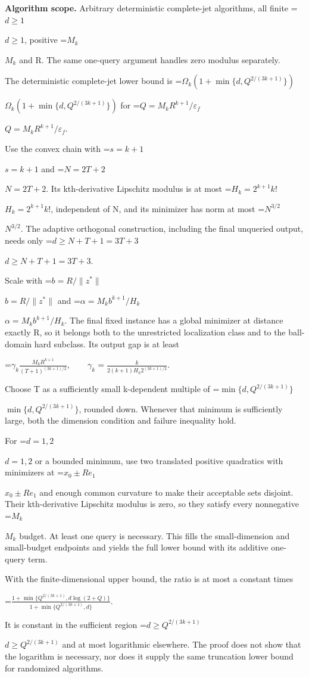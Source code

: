 \documentclass[10pt,a4paper]{article}
\newcommand{\AtlasMath}[1]{\par\begingroup\centering\setbox0=\hbox{$\displaystyle #1$}\ifdim\wd0>1.4\linewidth\typeout{ATLAS WIDE FORMULA: \the\wd0}\fi\ifdim\wd0>\linewidth\resizebox{\linewidth}{!}{\box0}\else\box0\fi\par\endgroup}
\newcommand{\AtlasInlineMath}[1]{\begingroup\setbox0=\hbox{$#1$}\ifdim\wd0>.4\linewidth\endgroup\AtlasMath{#1}\else\endgroup$#1$\fi}
\begin{document}
\textbf{Algorithm scope.} Arbitrary deterministic complete-jet algorithms, all finite \AtlasInlineMath{d\ge1}, positive \AtlasInlineMath{M_k} and R. The same one-query argument handles zero modulus separately.

The deterministic complete-jet lower bound is \AtlasInlineMath{\Omega_k(1+\min\{d,Q^{2/(3k+1)}\})} for \AtlasInlineMath{Q=M_kR^{k+1}/\varepsilon_f}.

Use the convex chain with \AtlasInlineMath{s=k+1} and \AtlasInlineMath{N=2T+2}. Its kth-derivative Lipschitz modulus is at most \AtlasInlineMath{H_k=2^{k+1}k!}, independent of N, and its minimizer has norm at most \AtlasInlineMath{N^{3/2}}. The adaptive orthogonal construction, including the final unqueried output, needs only \AtlasInlineMath{d\ge N+T+1=3T+3}.

Scale with \AtlasInlineMath{b=R/\|z^*\|} and \AtlasInlineMath{\alpha=M_kb^{k+1}/H_k}. The final fixed instance has a global minimizer at distance exactly R, so it belongs both to the unrestricted localization class and to the ball-domain hard subclass. Its output gap is at least

\AtlasMath{\gamma_k\frac{M_kR^{k+1}}{(T+1)^{(3k+1)/2}},\qquad
\gamma_k=\frac{k}{2(k+1)H_k2^{(3k+1)/2}}.}

Choose T as a sufficiently small k-dependent multiple of \AtlasInlineMath{\min\{d,Q^{2/(3k+1)}\}}, rounded down. Whenever that minimum is sufficiently large, both the dimension condition and failure inequality hold.

For \AtlasInlineMath{d=1,2} or a bounded minimum, use two translated positive quadratics with minimizers at \AtlasInlineMath{x_0\pm R e_1} and enough common curvature to make their acceptable sets disjoint. Their kth-derivative Lipschitz modulus is zero, so they satisfy every nonnegative \AtlasInlineMath{M_k} budget. At least one query is necessary. This fills the small-dimension and small-budget endpoints and yields the full lower bound with its additive one-query term.

With the finite-dimensional upper bound, the ratio is at most a constant times

\AtlasMath{\frac{1+\min\{Q^{2/(3k+1)},d\log(2+Q)\}}{1+\min\{Q^{2/(3k+1)},d\}}.}

It is constant in the sufficient region \AtlasInlineMath{d\ge Q^{2/(3k+1)}} and at most logarithmic elsewhere. The proof does not show that the logarithm is necessary, nor does it supply the same truncation lower bound for randomized algorithms.
\end{document}
